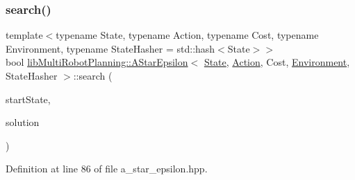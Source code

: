 \subsubsection{\texorpdfstring{search()}{search()}}
{\footnotesize\ttfamily template$<$typename State, typename Action, typename Cost, typename Environment, typename State\+Hasher = std\+::hash$<$\+State$>$$>$ \\
bool \hyperlink{classlib_multi_robot_planning_1_1_a_star_epsilon}{lib\+Multi\+Robot\+Planning\+::\+A\+Star\+Epsilon}$<$ \hyperlink{structlib_multi_robot_planning_1_1_state}{State}, \hyperlink{namespacelib_multi_robot_planning_aba73fb71693f86a324adfa0e41e1053d}{Action}, Cost, \hyperlink{classlib_multi_robot_planning_1_1_environment}{Environment}, State\+Hasher $>$\+::search (\begin{DoxyParamCaption}\item[{const \hyperlink{structlib_multi_robot_planning_1_1_state}{State} \&}]{start\+State,  }\item[{\hyperlink{structlib_multi_robot_planning_1_1_plan_result}{Plan\+Result}$<$ \hyperlink{structlib_multi_robot_planning_1_1_state}{State}, \hyperlink{namespacelib_multi_robot_planning_aba73fb71693f86a324adfa0e41e1053d}{Action}, Cost $>$ \&}]{solution }\end{DoxyParamCaption})\hspace{0.3cm}{\ttfamily [inline]}}



Definition at line 86 of file a\+\_\+star\+\_\+epsilon.\+hpp.

